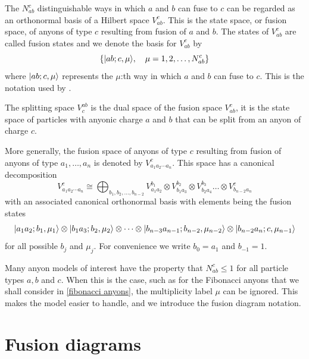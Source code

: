 The $N_{ab}^c$ distinguishable ways in which $a$ and $b$ can fuse to $c$ can be regarded as an orthonormal basis of a Hilbert space $V_{ab}^c$. This is the state space, or fusion space, of anyons of type $c$ resulting from fusion of $a$ and $b$. The states of $V_{ab}^c$ are called fusion states and we denote the basis for $V_{ab}^c$ by
\begin{equation}
  \{ \lvert ab;c,\mu\rangle, \quad \mu = 1,2,\ldots,N_{ab}^c \}
\end{equation}
where $\lvert ab;c,\mu\rangle$ represents the $\mu$:th way in which $a$ and $b$ can fuse to $c$. This is the notation used by \cite{preskill}.

The splitting space $V_c^{ab}$ is the dual space of the fusion space $V_{ab}^c$, it is the state space of particles with anyonic charge $a$ and $b$ that can be split from an anyon of charge $c$.

More generally, the fusion space of anyons of type $c$ resulting from fusion of anyons of type $a_1, \ldots, a_n$ is denoted by $V_{a_1 a_2 \cdots a_n}^c$. This space has a canonical decomposition
\begin{equation}
  V_{a_1 a_2 \cdots a_n}^c \cong \bigoplus_{b_1,b_2,\ldots,b_{n-2}} V_{a_1a_2}^{b_1} \otimes V_{b_1 a_3}^{b_2} \otimes V_{b_2 a_4}^{b_3} \ldots \otimes V_{b_{n-2} a_n}^c
\end{equation}
with an associated canonical orthonormal basis with elements being the fusion states
\begin{equation}
  \lvert a_1 a_2; b_1, \mu_1\rangle \otimes \lvert b_1 a_3; b_2, \mu_2\rangle \otimes \cdots \otimes \lvert b_{n-3} a_{n-1}; b_{n-2}, \mu_{n-2}\rangle \otimes \lvert b_{n-2} a_n; c, \mu_{n-1}\rangle
\end{equation}
for all possible $b_j$ and $\mu_j$. For convenience we write $b_{0} = a_1$ and $b_{-1} = 1$.

Many anyon models of interest have the property that $N_{ab}^c \le 1$ for all particle types $a, b$ and $c$. When this is the case, such as for the Fibonacci anyons that we shall consider in \cref{fibonacci anyons}, the multiplicity label $\mu$ can be ignored. This makes the model easier to handle, and we introduce the fusion diagram notation.


\section{Fusion diagrams}

